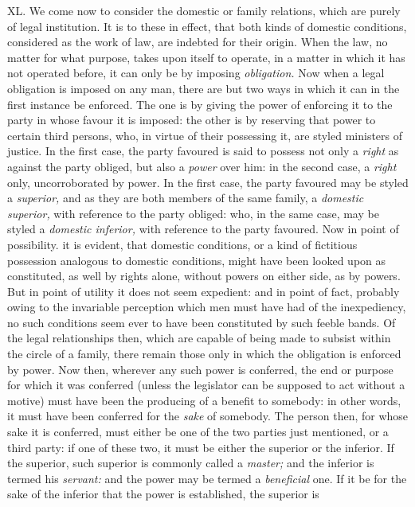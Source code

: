 \documentclass[12pt]{report}
\begin{document}
XL. We come now to consider the domestic or family relations, which are
purely of legal institution. It is to these in effect, that both kinds
of domestic conditions, considered as the work of law, are indebted for
their origin. When the law, no matter for what purpose, takes upon
itself to operate, in a matter in which it has not operated before, it
can only be by imposing \emph{obligation.} Now when a legal obligation
is imposed on any man, there are but two ways in which it can in the
first instance be enforced. The one is by giving the power of enforcing
it to the party in whose favour it is imposed: the other is by reserving
that power to certain third persons, who, in virtue of their possessing
it, are styled ministers of justice. In the first case, the party
favoured is said to possess not only a \emph{right} as against the party
obliged, but also a \emph{power} over him: in the second case, a
\emph{right} only, uncorroborated by power. In the first case, the party
favoured may be styled a \emph{superior,} and as they are both members
of the same family, a \emph{domestic superior,} with reference to the
party obliged: who, in the same case, may be styled a \emph{domestic
inferior,} with reference to the party favoured. Now in point of
possibility. it is evident, that domestic conditions, or a kind of
fictitious possession analogous to domestic conditions, might have been
looked upon as constituted, as well by rights alone, without powers on
either side, as by powers. But in point of utility it does not seem
expedient: and in point of fact, probably owing to the invariable
perception which men must have had of the inexpediency, no such
conditions seem ever to have been constituted by such feeble bands. Of
the legal relationships then, which are capable of being made to subsist
within the circle of a family, there remain those only in which the
obligation is enforced by power. Now then, wherever any such power is
conferred, the end or purpose for which it was conferred (unless the
legislator can be supposed to act without a motive) must have been the
producing of a benefit to somebody: in other words, it must have been
conferred for the \emph{sake} of somebody. The person then, for whose
sake it is conferred, must either be one of the two parties just
mentioned, or a third party: if one of these two, it must be either the
superior or the inferior. If the superior, such superior is commonly
called a \emph{master;} and the inferior is termed his \emph{servant:}
and the power may be termed a \emph{beneficial} one. If it be for the
sake of the inferior that the power is established, the superior is
\end{document}

